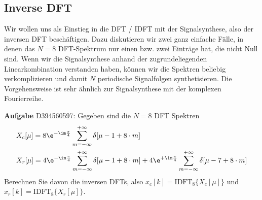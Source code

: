 \clearpage
\subsection{Inverse DFT}
\label{sec:D394560597}
\begin{Ziel}
Wir wollen uns als Einstieg in die DFT / IDFT mit der Signalsynthese, also
der inversen DFT beschäftigen. Dazu diskutieren wir zwei ganz einfache
Fälle, in denen das $N=8$ DFT-Spektrum nur einen bzw. zwei Einträge hat, die nicht Null sind.
Wenn wir die Signalsynthese anhand der zugrundeliegenden Linearkombination
verstanden haben, können wir die Spektren beliebig verkomplizieren und damit
$N$ periodische Signalfolgen synthetisieren.
Die Vorgehensweise ist sehr ähnlich zur Signalsynthese mit der komplexen
Fourierreihe.
\end{Ziel}
\textbf{Aufgabe} {\tiny D394560597}: Gegeben sind die $N=8$ DFT Spektren
\begin{align}
&X_c[\mu] = 8\e^{-\im\frac{\pi}{4}} \sum_{m=-\infty}^{+\infty} \delta[\mu-1 + 8 \cdot m]\\
&X_r[\mu] =
4\e^{-\im\frac{\pi}{4}} \sum_{m=-\infty}^{+\infty} \delta[\mu-1 + 8 \cdot m] +
4\e^{+\im\frac{\pi}{4}} \sum_{m=-\infty}^{+\infty} \delta[\mu-7 + 8 \cdot m]
\end{align}
Berechnen Sie davon die inversen DFTs, also $x_c[k] = \text{IDFT}_8\{X_c[\mu]\}$
und $x_r[k] = \text{IDFT}_8\{X_r[\mu]\}$.

